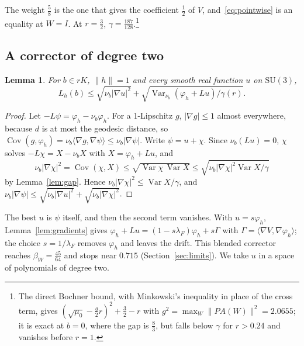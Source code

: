 \documentclass[11pt]{amsart}
\newtheorem{lemma}[theorem]{Lemma}
\theoremstyle{definition}
\theoremstyle{remark}
\numberwithin{equation}{section}
\newcommand{\SU}{\mathrm{SU}}
\newcommand{\Cov}{\operatorname{Cov}}
\newcommand{\Var}{\operatorname{Var}}
\newcommand{\ip}[2]{\langle #1,#2\rangle}
\begin{document}
The weight $\frac58$ is the one that gives the coefficient $\frac12$ of $V$,
and~\eqref{eq:pointwise} is an equality at $W=I$. At $r=\frac32$,
$\gamma=\frac{187}{128}$.\footnote{The direct Bochner bound, with
Minkowski's inequality in place of the cross term, gives
$(\sqrt{\mu_0}-\frac g2r)^2+\frac32-r$ with $g^2=\max_W\|PA(W)\|^2=2.0655$;
it is exact at $b=0$, where the gap is $\frac83$, but falls below $\gamma$
for $r>0.24$ and vanishes before $r=1$.}

\subsection{A corrector of degree two}

\begin{lemma}\label{lem:corrector}
For $b\in rK$, $\|h\|=1$ and every smooth real function $u$ on $\SU(3)$,
\[
L_h(b)\le\sqrt{\nu_b|\nabla u|^2}+\sqrt{\Var_{\nu_b}(\varphi_h+Lu)/
\gamma(r)} .
\]
\end{lemma}

\begin{proof}
Let $-L\psi=\varphi_h-\nu_b\varphi_h$. For a 1-Lipschitz $g$, $|\nabla g|\le1$
almost everywhere, because $d$ is at most the geodesic distance, so
$\Cov(g,\varphi_h)=\nu_b\ip{\nabla g}{\nabla\psi}\le\nu_b|\nabla\psi|$. Write
$\psi=u+\chi$. Since $\nu_b(Lu)=0$, $\chi$ solves $-L\chi=X-\nu_bX$ with
$X=\varphi_h+Lu$, and
\[
\nu_b|\nabla\chi|^2=\Cov(\chi,X)\le\sqrt{\Var\chi\,\Var X}\le
\sqrt{\nu_b|\nabla\chi|^2\Var X/\gamma}
\]
by Lemma~\ref{lem:gap}. Hence $\nu_b|\nabla\chi|^2\le\Var X/\gamma$, and
$\nu_b|\nabla\psi|\le\sqrt{\nu_b|\nabla u|^2}+\sqrt{\nu_b|\nabla
\chi|^2}$.
\end{proof}

The best $u$ is $\psi$ itself, and then the second term vanishes. With
$u=s\varphi_h$, Lemma~\ref{lem:gradients} gives $\varphi_h+Lu=(1-s\lambda_F)
\varphi_h+s\Gamma$ with $\Gamma=\ip{\nabla V}{\nabla\varphi_h}$; the choice
$s=1/\lambda_F$ removes $\varphi_h$ and leaves the drift. This blended
corrector reaches $\beta_W=\frac{45}{64}$ and stops near $0.715$
(Section~\ref{sec:limits}). We take $u$ in a space of polynomials of degree two.
\end{document}
